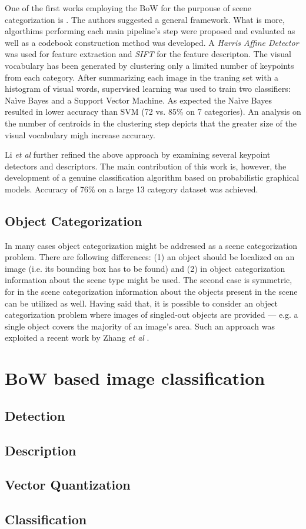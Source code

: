 \documentclass[a4paper,12pt]{article}
\begin{document}
  One of the first works employing the BoW for the purpouse of scene categorization is \cite{csurka2004visual}. The authors suggested a general framework. What is more, algorthims performing each main pipeline's step were proposed and evaluated as well as a codebook construction method was developed. A \emph{Harris Affine Detector} was used for feature extraction and \emph{SIFT} for the feature descripton. The visual vocabulary has been generated by clustering only a limited number of keypoints from each category. After summarizing each image in the traning set with a histogram of visual words, supervised learning was used to train two classifiers: Na\`ive Bayes and a Support Vector Machine. As expected the Na\`ive Bayes resulted in lower accuracy than SVM (72 vs. 85\% on 7 categories). An analysis on the number of centroids in the clustering step depicts that the greater size of the visual vocabulary migh increase accuracy. 
  
  Li \emph{et al} further refined the above approach by examining several keypoint detectors and descriptors. The main contribution of this work is, however, the development of a genuine classification algorithm based on probabilistic graphical models. Accuracy of 76\% on a large 13 category dataset was achieved.
  
  \subsection{Object Categorization}
  
  In many cases object categorization might be addressed as a scene categorization problem. There are following differences: (1) an object should be localized on an image (i.e. its bounding box has to be found) and (2) in object categorization information about the scene type might be used. The second case is symmetric, for in the scene categorization information about the objects present in the scene can be utilized as well. Having said that, it is possible to consider an object categorization problem where images of singled-out objects are provided --- e.g. a single object covers the majority of an image's area. Such an approach was exploited a recent work by Zhang \emph{et al} \cite{zhangcategory}. 
  

\section{BoW based image classification}

\subsection{Detection}
\subsection{Description}
\subsection{Vector Quantization}
\subsection{Classification}


\end{document}
